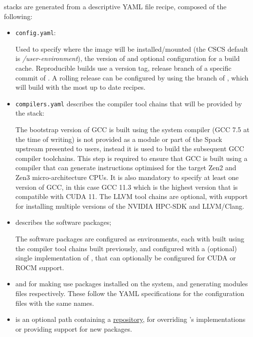 \stackinator stacks are generated from a descriptive YAML file recipe, composed of the following:
\begin{itemize}
    \item  \lstinline{config.yaml}:
        
        Used to specify where the image will be installed/mounted (the CSCS default is \emph{/user-environment}), the version of \spack and optional configuration for a \spack build cache. Reproducible builds use a version tag, release branch of a specific commit of \spack. A rolling release can be configured by using the  branch of \spack, which will build with the most up to date \spack recipes.
    \item \lstinline{compilers.yaml} describes the compiler tool chains that will be provided by the stack:
        
        The bootstrap version of GCC is built using the system compiler (GCC 7.5 at the time of writing) is not provided as a module or part of the Spack upstream presented to users, instead it is used to build the subsequent GCC compiler toolchains.
        This step is required to ensure that GCC is built using a compiler that can generate instructions optimised for the target Zen2 and Zen3 micro-architecture CPUs.
        It is also mandatory to specify at least one version of GCC, in this case GCC 11.3 which is the highest version that is compatible with CUDA 11.
        The LLVM tool chains are optional, with support for installing multiple versions of the NVIDIA HPC-SDK and LLVM/Clang.
    \item {} describes the software packages;
        
        The software packages are configured as environments, each with built using the compiler tool chains built previously, and configured with a (optional) single implementation of \craympich, that can optionally be configured for CUDA or ROCM support.
    \item {} and 
        for making \spack use packages installed on the system, and generating modules files respectively.
        These follow the YAML specifications for the \spack configuration files with the same names.
    \item {}
        is an optional path containing a \href{https://spack.readthedocs.io/en/latest/repositories.html}{\spack repository}, for overriding \spack's implementations or providing support for new packages.
\end{itemize}

